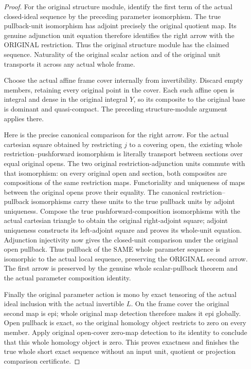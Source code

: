 \begin{proof}
For the original structure module, identify the first term of the actual
closed-ideal sequence by the preceding parameter isomorphism. The true
pullback-unit isomorphism has adjoint precisely the original quotient
map. Its genuine adjunction unit equation therefore identifies the right
arrow with the ORIGINAL restriction. Thus the original structure module
has the claimed sequence. Naturality of the original scalar action and
of the original unit transports it across any actual whole frame.

Choose the actual affine frame cover internally from invertibility.
Discard empty members, retaining every original point in the cover.
Each such affine open is integral and dense in the original integral
$Y$, so its composite to the original base is dominant and quasi-compact.
The preceding structure-module argument applies there.

Here is the precise canonical comparison for the right arrow. For the
actual cartesian square obtained by restricting $j$ to a covering open,
the existing whole restriction--pushforward isomorphism is literally
transport between sections over equal original opens. The two original
restriction-adjunction units commute with that isomorphism: on every
original open and section, both composites are compositions of the same
restriction maps. Functoriality and uniqueness of maps between the
original opens prove their equality. The canonical restriction--pullback
isomorphisms carry these units to the true pullback units by adjoint
uniqueness. Compose the true pushforward-composition isomorphisms with
the actual cartesian triangle to obtain the original right-adjoint
square; adjoint uniqueness constructs its left-adjoint square and
proves its whole-unit equation. Adjunction injectivity now gives the
closed-unit comparison under the original open pullback. Thus pullback
of the SAME whole parameter sequence is isomorphic to the actual local
sequence, preserving the ORIGINAL second arrow. The first arrow is
preserved by the genuine whole scalar-pullback theorem and the actual
parameter composition identity.

Finally the original parameter action is mono by exact tensoring of the
actual ideal inclusion with the actual invertible $L$. On the frame
cover the original second map is epi; whole original map detection
therefore makes it epi globally. Open pullback is exact, so the original
homology object restricts to zero on every member. Apply original
open-cover zero-map detection to its identity to conclude that this
whole homology object is zero. This proves exactness and finishes the
true whole short exact sequence without an input unit, quotient or
projection comparison certificate.
\end{proof}

